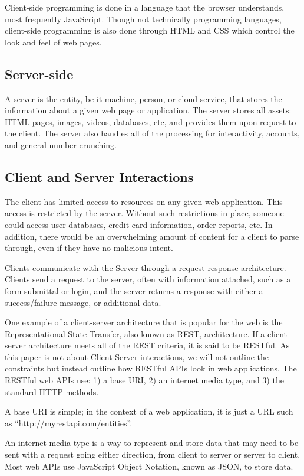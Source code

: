 \documentclass[12pt]{ucthesis}
\begin{document}
Client-side programming is done in a language that the browser understands, most frequently JavaScript. Though not technically programming languages, client-side programming is also done through HTML and CSS which control the look and feel of web pages.

\subsection{Server-side}
A server is the entity, be it machine, person, or cloud service, that stores the information about a given web page or application. The server stores all assets: HTML pages, images, videos, databases, etc, and provides them upon request to the client. The server also handles all of the processing for interactivity, accounts, and general number-crunching.

\subsection{Client and Server Interactions}
The client has limited access to resources on any given web application. This access is restricted by the server. Without such restrictions in place, someone could access user databases, credit card information, order reports, etc. In addition, there would be an overwhelming amount of content for a client to parse through, even if they have no malicious intent.

Clients communicate with the Server through a request-response architecture. Clients send a request to the server, often with information attached, such as a form submittal or login, and the server returns a response with either a success/failure message, or additional data.

One example of a client-server architecture that is popular for the web is the Representational State Transfer, also known as REST, architecture. If a client-server architecture meets all of the REST criteria, it is said to be RESTful. As this paper is not about Client Server interactions, we will not outline the constraints but instead outline how RESTful APIs look in web applications. The RESTful web APIs use: 1) a base URI, 2) an internet media type, and 3) the standard HTTP methods.

A base URI is simple; in the context of a web application, it is just a URL such as ``http://myrestapi.com/entities''.

An internet media type is a way to represent and store data that may need to be sent with a request going either direction, from client to server or server to client. Most web APIs use JavaScript Object Notation, known as JSON, to store data.
\end{document}
